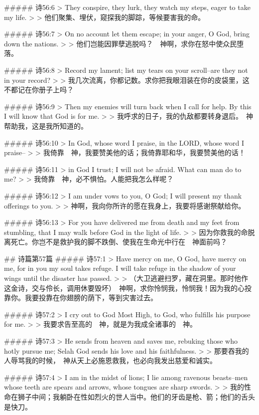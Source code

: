 ##### 诗56:6
> They conspire, they lurk, they watch my steps, eager to take my life.
>
> 他们聚集、埋伏，窥探我的脚踪，等候要害我的命。


##### 诗56:7
> On no account let them escape; in your anger, O God, bring down the nations.
>
> 他们岂能因罪孽逃脱吗？　神啊，求你在怒中使众民堕落。


##### 诗56:8
> Record my lament; list my tears on your scroll--are they not in your record?
>
> 我几次流离，你都记数。求你把我眼泪装在你的皮袋里，这不都记在你册子上吗？


##### 诗56:9
> Then my enemies will turn back when I call for help. By this I will know that God is for me.
>
> 我呼求的日子，我的仇敌都要转身退后。　神帮助我，这是我所知道的。


##### 诗56:10
> In God, whose word I praise, in the LORD, whose word I praise--
>
> 我倚靠　神，我要赞美他的话；我倚靠耶和华，我要赞美他的话！


##### 诗56:11
> in God I trust; I will not be afraid. What can man do to me?
>
> 我倚靠　神，必不惧怕。人能把我怎么样呢？


##### 诗56:12
> I am under vows to you, O God; I will present my thank offerings to you.
>
> 神啊，我向你所许的愿在我身上，我要将感谢祭献给你。


##### 诗56:13
> For you have delivered me from death and my feet from stumbling, that I may walk before God in the light of life.
>
> 因为你救我的命脱离死亡。你岂不是救护我的脚不跌倒、使我在生命光中行在　神面前吗？


## 诗篇第57篇
##### 诗57:1
> Have mercy on me, O God, have mercy on me, for in you my soul takes refuge. I will take refuge in the shadow of your wings until the disaster has passed.
>
> （大卫逃避扫罗，藏在洞里。那时他作这金诗，交与伶长，调用休要毁坏）　神啊，求你怜悯我，怜悯我！因为我的心投靠你。我要投靠在你翅膀的荫下，等到灾害过去。


##### 诗57:2
> I cry out to God Most High, to God, who fulfills his purpose for me.
>
> 我要求告至高的　神，就是为我成全诸事的　神。


##### 诗57:3
> He sends from heaven and saves me, rebuking those who hotly pursue me; Selah God sends his love and his faithfulness.
>
> 那要吞我的人辱骂我的时候，　神从天上必施恩救我，也必向我发出慈爱和诚实。


##### 诗57:4
> I am in the midst of lions; I lie among ravenous beasts--men whose teeth are spears and arrows, whose tongues are sharp swords.
>
> 我的性命在狮子中间；我躺卧在性如烈火的世人当中。他们的牙齿是枪、箭；他们的舌头是快刀。



